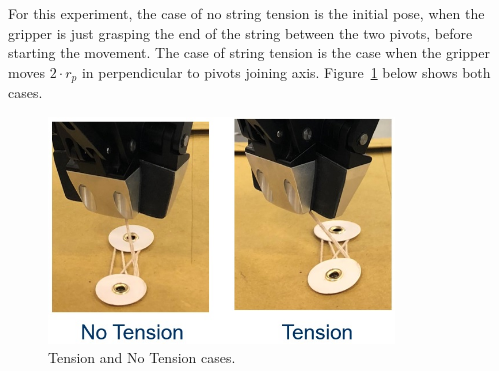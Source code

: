 For this experiment, the case of no string tension is the initial pose, when the gripper is just grasping the end of the string between the two pivots, before starting the movement. The case of string tension is the case when the gripper moves $2 \cdot r_{p}$ in perpendicular to pivots joining axis. Figure~\ref{fig:exp1} below shows both cases.
\begin{figure}[h!]
	\centering
	\includegraphics[height=60mm]{chapters/figures/experiments/exp1.jpg}
	\caption{Tension and No Tension cases.}
	\label{fig:exp1}
\end{figure}

